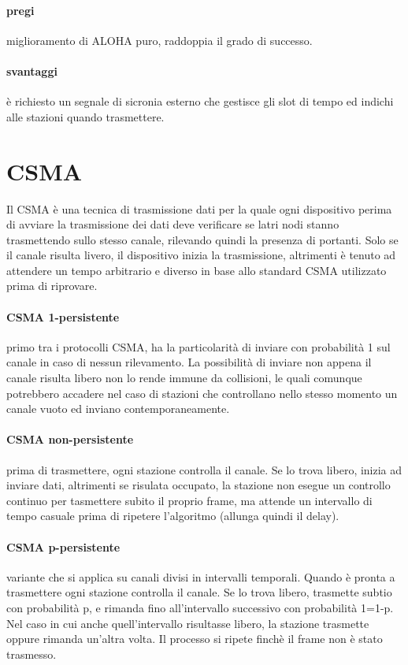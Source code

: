 \documentclass{article}
\begin{document}
\paragraph{pregi} miglioramento di ALOHA puro, raddoppia il grado di successo.

\paragraph{svantaggi} è richiesto un segnale di sicronia esterno che gestisce
gli slot di tempo ed indichi alle stazioni quando trasmettere.

\section{CSMA}

Il CSMA è una tecnica di trasmissione dati per la quale ogni dispositivo perima
di avviare la trasmissione dei dati deve verificare se latri nodi stanno
trasmettendo sullo stesso canale, rilevando quindi la presenza di portanti. Solo
se il canale risulta livero, il dispositivo inizia la trasmissione, altrimenti è
tenuto ad attendere un tempo arbitrario e diverso in base allo standard CSMA
utilizzato prima di riprovare.

\paragraph{CSMA 1-persistente} primo tra i protocolli CSMA, ha la particolarità
di inviare con probabilità 1 sul canale in caso di nessun rilevamento. La
possibilità di inviare non appena il canale risulta libero non lo rende immune
da collisioni, le quali comunque potrebbero accadere nel caso di stazioni che
controllano nello stesso momento un canale vuoto ed inviano contemporaneamente.

\paragraph{CSMA non-persistente} prima di trasmettere, ogni stazione controlla
il canale. Se lo trova libero, inizia ad inviare dati, altrimenti se risulata
occupato, la stazione non esegue un controllo continuo per tasmettere subito il
proprio frame, ma attende un intervallo di tempo casuale prima di ripetere
l'algoritmo (allunga quindi il delay).

\paragraph{CSMA p-persistente} variante che si applica su canali divisi in
intervalli temporali. Quando è pronta a trasmettere ogni stazione controlla il
canale. Se lo trova libero, trasmette subtio con probabilità p, e rimanda fino
all'intervallo successivo con probabilità 1=1-p. Nel caso in cui anche
quell'intervallo risultasse libero, la stazione trasmette oppure rimanda
un'altra volta. Il processo si ripete finchè il frame non è stato trasmesso.
\end{document}
